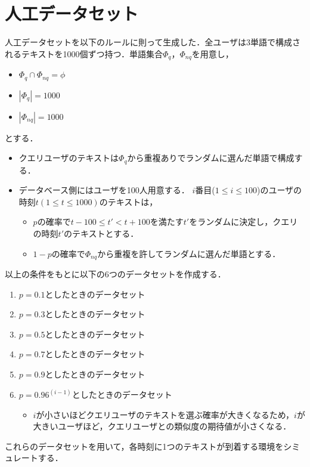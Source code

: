 \section{人工データセット}
人工データセットを以下のルールに則って生成した．全ユーザは3単語で構成されるテキストを1000個ずつ持つ．単語集合$\Phi_q，\Phi_{nq}$を用意し，
\begin{itemize}
    \item $\Phi_q \cap \Phi_{nq} = \phi$
    \item $|\Phi_q|=1000$
    \item $|\Phi_{nq}|=1000$
\end{itemize}
とする．
\begin{itemize}
    \item クエリユーザのテキストは$\Phi_q$から重複ありでランダムに選んだ単語で構成する．
    \item データベース側にはユーザを100人用意する．
    $i$番目($1\le i \le 100$)のユーザの時刻$t(1\le t\le 1000)$のテキストは，
    \begin{itemize}
        \item $p$の確率で$t-100 \le t' < t+100$を満たす$t'$をランダムに決定し，クエリの時刻$t'$のテキストとする．
        \item $1-p$の確率で$\Phi_{nq}$から重複を許してランダムに選んだ単語とする．
    \end{itemize}
\end{itemize}
以上の条件をもとに以下の6つのデータセットを作成する．
\begin{enumerate}
    \item $p=0.1$としたときのデータセット
    \item $p=0.3$としたときのデータセット
    \item $p=0.5$としたときのデータセット
    \item $p=0.7$としたときのデータセット
    \item $p=0.9$としたときのデータセット
    \item $p=0.96^{(i-1)}$としたときのデータセット
    \begin{itemize}
        \item $i$が小さいほどクエリユーザのテキストを選ぶ確率が大きくなるため，$i$が大きいユーザほど，クエリユーザとの類似度の期待値が小さくなる．
    \end{itemize}
\end{enumerate}
これらのデータセットを用いて，各時刻に1つのテキストが到着する環境をシミュレートする．

